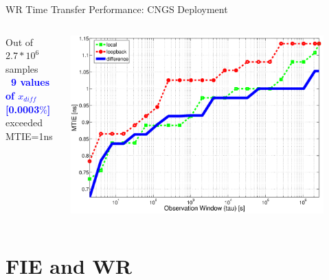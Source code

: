 \documentclass[compress,red]{beamer}
\begin{document}
\begin{frame}{WR Time Transfer Performance: CNGS Deployment}

  \begin{columns}[c]
	  \begin{center}

	    Out of $2.7*10^6$ samples\\
			\textbf{\textcolor{blue}{~9 values of $x_{diff}$ [0.0003$\%$]}} \\
                       exceeded MTIE=1ns
		


	  \end{center}
		\begin{center}
		\includegraphics[width=0.9\textwidth]{measurements/MTIE2.pdf}
		\end{center}
  \end{columns}
\end{frame}


\section{FIE and WR}
\end{document}
